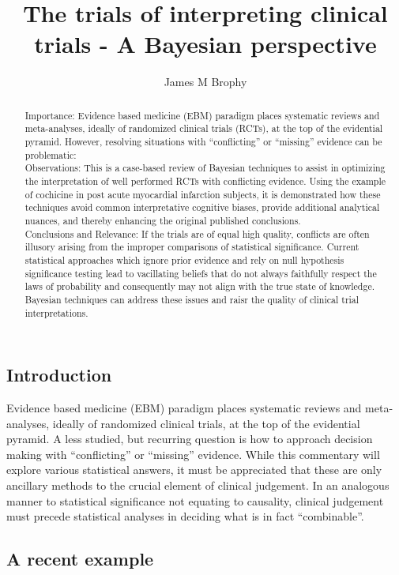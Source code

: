\documentclass[
  letterpaper,
  DIV=11,
  numbers=noendperiod]{scrartcl}
\title{The trials of interpreting clinical trials - A Bayesian
perspective}
\author{James M Brophy}
\date{}
\begin{document}
\maketitle
\begin{abstract}
Importance: Evidence based medicine (EBM) paradigm places systematic
reviews and meta-analyses, ideally of randomized clinical trials (RCTs),
at the top of the evidential pyramid. However, resolving situations with
``conflicting'' or ``missing'' evidence can be problematic:\\
Observations: This is a case-based review of Bayesian techniques to
assist in optimizing the interpretation of well performed RCTs with
conflicting evidence. Using the example of cochicine in post acute
myocardial infarction subjects, it is demonstrated how these techniques
avoid common interpretative cognitive biases, provide additional
analytical nuances, and thereby enhancing the original published
conclusions.\\
Conclusions and Relevance: If the trials are of equal high quality,
conflicts are often illusory arising from the improper comparisons of
statistical significance. Current statistical approaches which ignore
prior evidence and rely on null hypothesis significance testing lead to
vacillating beliefs that do not always faithfully respect the laws of
probability and consequently may not align with the true state of
knowledge. Bayesian techniques can address these issues and raisr the
quality of clinical trial interpretations.
\end{abstract}


\subsection{Introduction}\label{introduction}

Evidence based medicine (EBM) paradigm places systematic reviews and
meta-analyses, ideally of randomized clinical trials, at the top of the
evidential pyramid. A less studied, but recurring question is how to
approach decision making with ``conflicting'' or ``missing'' evidence.
While this commentary will explore various statistical answers, it must
be appreciated that these are only ancillary methods to the crucial
element of clinical judgement. In an analogous manner to statistical
significance not equating to causality, clinical judgement must precede
statistical analyses in deciding what is in fact ``combinable''.

\subsection{A recent example}\label{a-recent-example}
\end{document}
